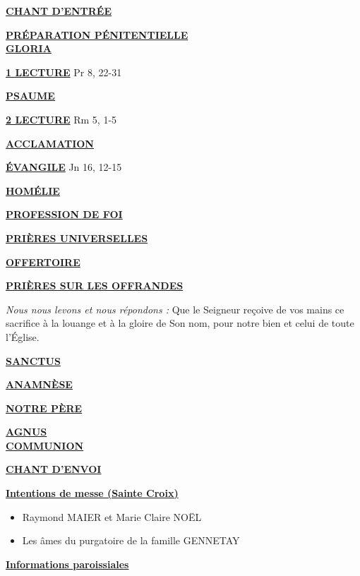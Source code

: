 \documentclass[french,11pt,a4paper]{article}
\newcommand*{\chants}{../chants}
\newcommand*{\messe}{../messe_bienveillance}
\newcommand*{\pu}{../pu}
\newcommand*{\psaumes}{../psaumes}
\newcommand{\NewsItem}[1]{%
\vspace{3pt}
\underline{\textbf{#1}}
		  }
\begin{document}
\NewsItem{CHANT D'ENTRÉE}
	

\NewsItem{PRÉPARATION PÉNITENTIELLE} \\
	

\NewsItem{GLORIA}
	


\NewsItem{1\iere{} LECTURE} Pr 8, 22-31

\NewsItem{PSAUME}


\NewsItem{2\ieme{} LECTURE} Rm 5, 1-5

\NewsItem{ACCLAMATION}
%

\NewsItem{ÉVANGILE} Jn 16, 12-15

\NewsItem{HOMÉLIE}

\NewsItem{PROFESSION DE FOI}


\NewsItem{PRIÈRES UNIVERSELLES} 


\NewsItem{OFFERTOIRE}

\NewsItem{PRIÈRES SUR LES OFFRANDES}
\textit{Nous nous levons et nous répondons : }
Que le Seigneur reçoive de vos mains ce sacrifice à la louange et à la gloire 
de Son nom, pour notre bien et celui de toute l’Église.

\NewsItem{SANCTUS}


\NewsItem{ANAMNÈSE}


\NewsItem{NOTRE PÈRE}

\NewsItem{AGNUS} \\


\NewsItem{COMMUNION}


\NewsItem{CHANT D'ENVOI}


\newpage


\NewsItem{Intentions de messe (Sainte Croix)}
\begin{itemize}
\item[\Cross]
Raymond MAIER et Marie Claire NOËL
\item[\Cross]
Les âmes du purgatoire de la famille GENNETAY
\end{itemize}

\NewsItem{Informations paroissiales}
\end{document}
